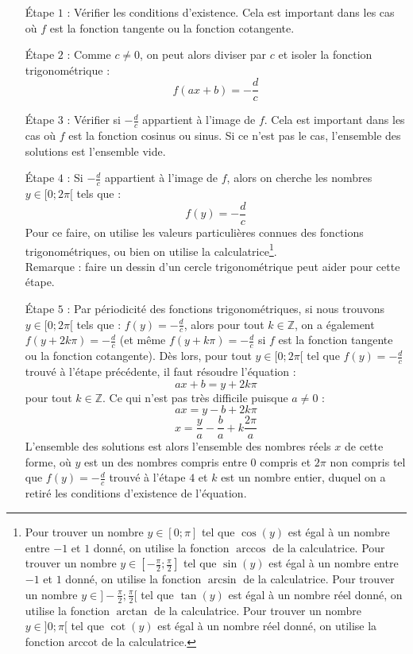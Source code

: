 \documentclass[a4paper,fontsize=13pt]{scrreprt}
\theoremstyle{plain}
\theoremstyle{definition}
\newcommand{\zz}{\mathbb{Z}}
\begin{document}
\begin{itemize}
\item [\'Etape $1$ :] Vérifier les conditions d'existence. Cela est important dans les cas où $f$ est la fonction tangente ou la fonction cotangente.
\item [\'Etape $2$ :] Comme $c \neq 0$, on peut alors diviser par $c$ et isoler la fonction trigonométrique :
$$f(ax+b)=-\frac{d}{c}$$
\item [\'Etape $3$ :] Vérifier si $-\frac{d}{c}$ appartient à l'image de $f$. Cela est important dans les cas où $f$ est la fonction cosinus ou sinus. Si ce n'est pas le cas, l'ensemble des solutions est l'ensemble vide.
\item [\'Etape $4$ :] Si $-\frac{d}{c}$ appartient à l'image de $f$, alors on cherche les nombres $y \in [0;2\pi[$ tels que :
$$f(y) = -\frac{d}{c}$$
Pour ce faire, on utilise les valeurs particulières connues des fonctions trigonométriques, ou bien on utilise la calculatrice\footnote{Pour trouver un nombre $y \in [0;\pi]$ tel que $\cos(y)$ est égal à un nombre entre $-1$ et $1$ donné, on utilise la fonction $\arccos$ de la calculatrice. Pour trouver un nombre $y \in [-\frac{\pi}{2};\frac{\pi}{2}]$ tel que $\sin(y)$ est égal à un nombre entre $-1$ et $1$ donné, on utilise la fonction $\arcsin$ de la calculatrice. Pour trouver un nombre $y \in ]-\frac{\pi}{2};\frac{\pi}{2}[$ tel que $\tan(y)$ est égal à un nombre réel donné, on utilise la fonction $\arctan$ de la calculatrice. Pour trouver un nombre $y \in ]0;\pi[$ tel que $\cot(y)$ est égal à un nombre réel donné, on utilise la fonction $\mathrm{arccot}$ de la calculatrice.}. \\
Remarque : faire un dessin d'un cercle trigonométrique peut aider pour cette étape.
\item [\'Etape $5$ :] Par périodicité des fonctions trigonométriques, si nous trouvons $y \in [0;2\pi[$ tels que :
$f(y) = -\frac{d}{c}$, alors pour tout $k \in \zz$, on a également $f(y+2k\pi) = -\frac{d}{c}$ (et même $f(y+k\pi) = -\frac{d}{c}$ si $f$ est la fonction tangente ou la fonction cotangente). Dès lors, pour tout $y \in [0;2\pi[$ tel que $f(y) = -\frac{d}{c}$ trouvé à l'étape précédente, il faut résoudre l'équation :
$$ax+b = y +2k\pi$$
pour tout $k \in \zz$. Ce qui n'est pas très difficile puisque $a \neq 0$ :
$$ax = y-b +2k\pi$$
$$x = \frac{y}{a}-\frac{b}{a} +k\frac{2\pi}{a}$$
L'ensemble des solutions est alors l'ensemble des nombres réels $x$ de cette forme, où $y$ est un des nombres compris entre $0$ compris et $2\pi$ non compris tel que $f(y) = -\frac{d}{c}$ trouvé à l'étape $4$ et $k$ est un nombre entier, duquel on a retiré les conditions d'existence de l'équation.
\end{itemize}
\end{document}
